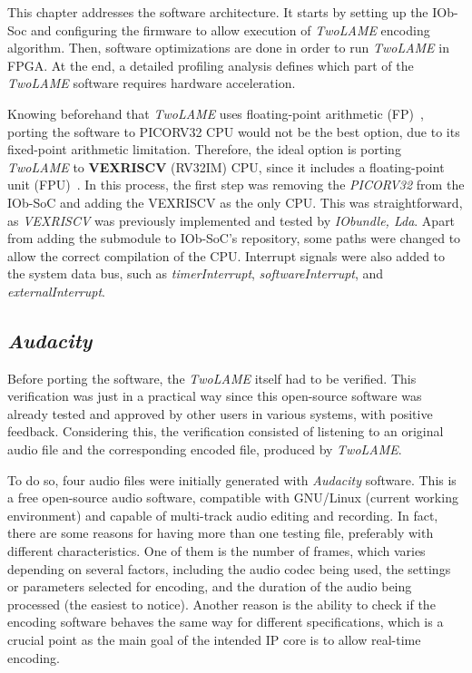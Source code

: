\documentclass{article}
\begin{document}

This chapter addresses the software architecture.
It starts by setting up the IOb-Soc and configuring the firmware to allow execution of \textit{TwoLAME} encoding algorithm. Then, software optimizations are done in order to run \textit{TwoLAME} in FPGA. 
At the end, a detailed profiling analysis defines which part of the \textit{TwoLAME} software requires hardware acceleration.

Knowing beforehand that \textit{TwoLAME} uses floating-point arithmetic (FP)~\cite{floatingpoint}, porting the software to PICORV32 CPU would not be the best option, due to its fixed-point arithmetic limitation. Therefore, the ideal option is porting \textit{TwoLAME} to \textbf{VEXRISCV} (RV32IM) CPU, since it includes a floating-point unit (FPU)~\cite{fpu}.
In this process, the first step was removing the \textit{PICORV32} from the IOb-SoC and adding the VEXRISCV as the only CPU. This was straightforward, as \textit{VEXRISCV} was previously implemented and tested by \textit{IObundle, Lda}. Apart from adding the submodule to IOb-SoC's repository, some paths were changed to allow the correct compilation of the CPU. Interrupt signals were also added to the system data bus, such as \textit{timerInterrupt}, \textit{softwareInterrupt}, and \textit{externalInterrupt}.

\subsection{\textit{Audacity}}

Before porting the software, the \textit{TwoLAME} itself had to be verified. This verification was just in a practical way since this open-source software was already tested and approved by other users in various systems, with positive feedback. Considering this, the verification consisted of listening to an original audio file and the corresponding encoded file, produced by \textit{TwoLAME}.

To do so, four audio files were initially generated with \textit{Audacity} software. This is a free open-source audio software, compatible with GNU/Linux (current working environment) and capable of multi-track audio editing and recording.
In fact, there are some reasons for having more than one testing file, preferably with different characteristics. One of them is the number of frames, which varies depending on several factors, including the audio codec being used, the settings or parameters selected for encoding, and the duration of the audio being processed (the easiest to notice). Another reason is the ability to check if the encoding software behaves the same way for different specifications, which is a crucial point as the main goal of the intended IP core is to allow real-time encoding.
\end{document}
